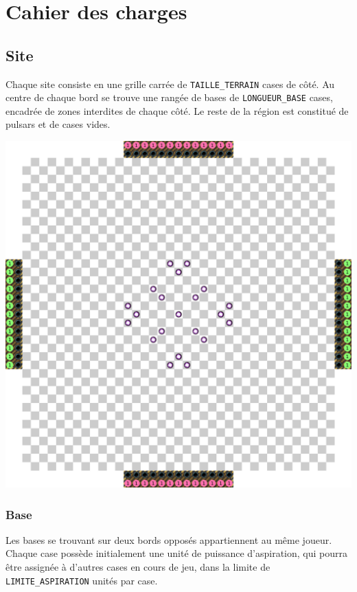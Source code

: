 \section{Cahier des charges}\label{cahier-des-charges}

\subsection{Site}\label{site}

Chaque site consiste en une grille carrée de \texttt{TAILLE\_TERRAIN}
cases de côté. Au centre de chaque bord se trouve une rangée de bases de
\texttt{LONGUEUR\_BASE} cases, encadrée de zones interdites de chaque
côté. Le reste de la région est constitué de pulsars et de cases vides.

\noindent\includegraphics[width=\textwidth]{asset/site.png}

\subsubsection{Base}\label{base}

Les bases se trouvant sur deux bords opposés appartiennent au même
joueur. Chaque case possède initialement une unité de puissance
d'aspiration, qui pourra être assignée à d'autres cases en cours de jeu,
dans la limite de \texttt{LIMITE\_ASPIRATION} unités par case.


